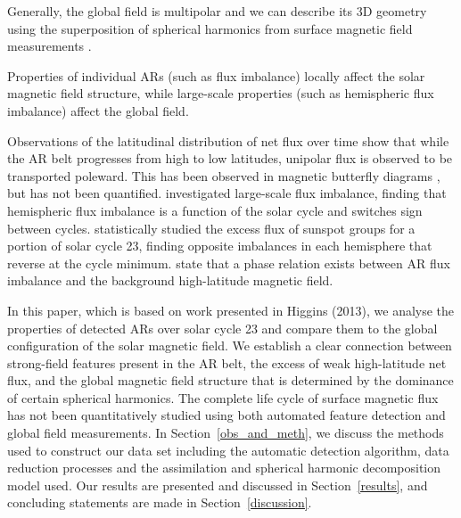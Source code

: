 \documentclass[namedreferences]{solarphysics}
\begin{document}
\begin{article}
{Generally, the global field is multipolar and we can describe its 3D geometry using the superposition of spherical harmonics from surface magnetic field measurements \citep{stenflo:1986, stenflo:1988, knaack:2005,mordvinov:2007,Mackay:2012,DeRosa:2012}.

Properties of individual ARs (such as flux imbalance) locally affect the solar magnetic field structure, while large-scale properties (such as hemispheric flux imbalance) affect the global field.

Observations of the latitudinal distribution of net flux over time show that while the AR belt progresses from high to low latitudes, unipolar flux is observed to be transported poleward. This has been observed in magnetic butterfly diagrams \citep{harvey:1992}, but has not been quantified.
\citet{Choudhary:2002} investigated large-scale flux imbalance, finding that hemispheric flux imbalance is a function of the solar cycle and switches sign between cycles. \citet{zharkov:2006} statistically studied the excess flux of sunspot groups  for a portion of solar cycle 23, finding opposite imbalances in each hemisphere that reverse at the cycle minimum. \citet{Zharkov:2008} state that a phase relation exists between AR flux imbalance and the background high-latitude magnetic field. 


In this paper, which is based on work presented in Higgins (2013), we analyse the properties of detected ARs over solar cycle 23 and compare them to the global configuration of the solar magnetic field. %
We establish a clear connection between strong-field features present in the AR belt, the excess of weak high-latitude net flux, and the global magnetic field structure that is determined by the dominance of certain spherical harmonics. The complete life cycle of surface magnetic flux has not been quantitatively studied using both automated feature detection and global field measurements.  
In Section~\ref{obs_and_meth}, we discuss the methods used to construct our data set including the automatic detection algorithm, data reduction processes and the assimilation and spherical harmonic decomposition model used. Our results are presented and discussed in Section~\ref{results}, and concluding statements are made in Section~\ref{discussion}.











}
\end{article}
\end{document}
